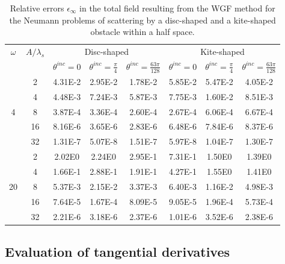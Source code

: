 \documentclass[10pt]{article}
\numberwithin{equation}{section}
\begin{document}
\begin{table}[htbp]
\centering
\begin{tabular}{|c|c|c|c|c|c|c|c|}
\hline
\multirow{2}{*}{$\omega$} & \multirow{2}{*}{$A/\lambda_s$} & \multicolumn{3}{|c|}{Disc-shaped}  & \multicolumn{3}{|c|}{Kite-shaped}\\
\cline{3-8}
& & $\theta^{inc}=0$ & $\theta^{inc}=\frac{\pi}{4}$ & $\theta^{inc}=\frac{63\pi}{128}$
& $\theta^{inc}=0$ & $\theta^{inc}=\frac{\pi}{4}$ & $\theta^{inc}=\frac{63\pi}{128}$  \\
\hline
  & 2  & 4.31E-2 & 2.95E-2 & 1.78E-2 & 5.85E-2 & 5.47E-2 & 4.05E-2 \\
  & 4  & 4.48E-3 & 7.24E-3 & 5.87E-3 & 7.75E-3 & 1.60E-2 & 8.51E-3 \\
4 & 8  & 3.87E-4 & 3.36E-4 & 2.60E-4 & 2.67E-4 & 6.06E-4 & 6.67E-4 \\
  & 16 & 8.16E-6 & 3.65E-6 & 2.83E-6 & 6.48E-6 & 7.84E-6 & 8.37E-6 \\
  & 32 & 1.31E-7 & 5.07E-8 & 1.51E-7 & 5.97E-8 & 1.04E-7 & 1.30E-7 \\
\hline
   & 2  & 2.02E0  & 2.24E0  & 2.95E-1 & 7.31E-1 & 1.50E0  & 1.39E0  \\
   & 4  & 1.66E-1 & 2.88E-1 & 1.91E-1 & 4.27E-1 & 1.55E0  & 1.41E0  \\
20 & 8  & 5.37E-3 & 2.15E-2 & 3.37E-3 & 6.40E-3 & 1.16E-2 & 4.98E-3 \\
   & 16 & 7.64E-5 & 1.67E-4 & 8.09E-5 & 9.05E-5 & 1.96E-4 & 5.73E-4 \\
   & 32 & 2.21E-6 & 3.18E-6 & 2.37E-6 & 1.01E-6 & 3.52E-6 & 2.38E-6 \\
\hline
\end{tabular}
\caption{Relative errors $\epsilon_\infty$ in the total field  resulting from the  WGF method for the Neumann problems of scattering by a disc-shaped and a kite-shaped obstacle within a half space.}
\label{Table2D.2}
\end{table}
\subsection{Evaluation of tangential derivatives}
\label{sec:4.4}
\end{document}
